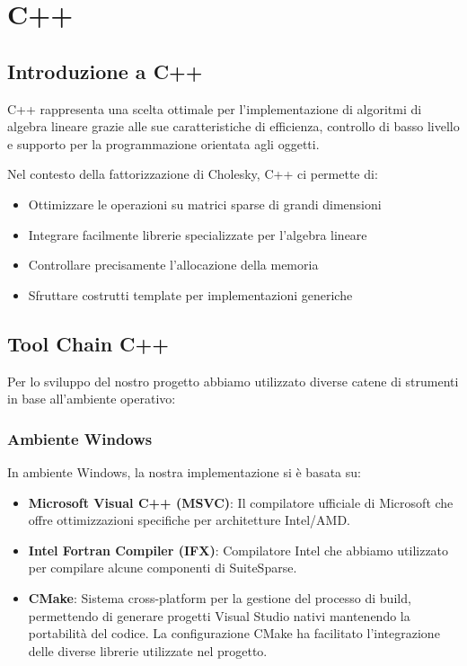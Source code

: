 \chapter{C++}

\section{Introduzione a C++}

C++ rappresenta una scelta ottimale per l'implementazione di algoritmi di algebra lineare grazie alle sue caratteristiche 
di efficienza, controllo di basso livello e supporto per la programmazione orientata agli oggetti.

Nel contesto della fattorizzazione di Cholesky, C++ ci permette di:
\begin{itemize}
    \item Ottimizzare le operazioni su matrici sparse di grandi dimensioni
    \item Integrare facilmente librerie specializzate per l'algebra lineare
    \item Controllare precisamente l'allocazione della memoria
    \item Sfruttare costrutti template per implementazioni generiche
\end{itemize}

\section{Tool Chain C++}

Per lo sviluppo del nostro progetto abbiamo utilizzato diverse catene di strumenti in base all'ambiente operativo:

\subsection{Ambiente Windows}
In ambiente Windows, la nostra implementazione si è basata su:

\begin{itemize}
    \item \textbf{Microsoft Visual C++ (MSVC)}: Il compilatore ufficiale di Microsoft che offre ottimizzazioni specifiche per 
    architetture Intel/AMD.
    
    \item \textbf{Intel Fortran Compiler (IFX)}: Compilatore Intel che abbiamo utilizzato per compilare alcune componenti di SuiteSparse.

    \item \textbf{CMake}: Sistema cross-platform per la gestione del processo di build, permettendo di generare progetti 
    Visual Studio nativi mantenendo la portabilità del codice. La configurazione CMake ha facilitato l'integrazione delle diverse 
    librerie utilizzate nel progetto.
\end{itemize}

